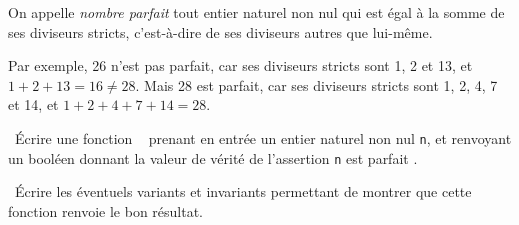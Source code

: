 On appelle \emph{nombre parfait} tout entier naturel non nul qui est égal à la somme de ses diviseurs stricts, c'est-à-dire de 
ses diviseurs autres que lui-même.

Par exemple, 26 n'est pas parfait, car ses diviseurs stricts sont 1, 2 et 13, et $1+2+13=16\neq 28$.
Mais 28 est parfait, car ses diviseurs stricts sont 1, 2, 4, 7 et 14, et $1+2+4+7+14=28$.

\question\ Écrire une fonction \python\  prenant en entrée un entier naturel non nul \texttt{n}, et renvoyant un booléen donnant la valeur de 
vérité de l'assertion \og \texttt{n} est parfait \fg. 

\question\ Écrire les éventuels variants et invariants permettant de montrer que cette fonction renvoie le bon résultat.

